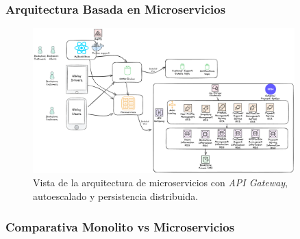 \subsubsection{Arquitectura Basada en Microservicios}

\begin{figure}[H]
  \centering
  \includegraphics[width=0.9\textwidth]{Figures/2. Architecture/MicroservicesArchitecture.png}
  \caption{Vista de la arquitectura de microservicios con \emph{API Gateway},
           autoescalado y persistencia distribuida.}
  \label{fig:microservices}
\end{figure}

\subsubsection{Comparativa Monolito vs Microservicios}

